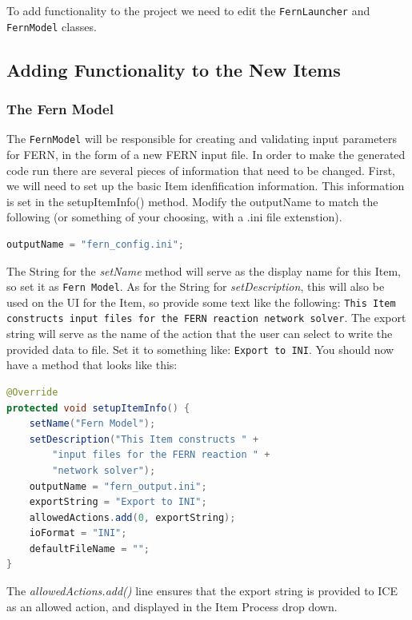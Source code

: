 To add functionality to the project we need to edit
the \texttt{FernLauncher} and \texttt{FernModel} classes.

\subsection{Adding Functionality to the New Items}

\subsubsection{The Fern Model}

The \texttt{FernModel} will be responsible for creating and
validating input parameters for FERN, in the form of a new FERN input file.  In
order to make the generated code run there are several pieces of information that need to be changed.  First, we
will need to set up the basic Item idenfification information. This information
is set in the setupItemInfo() method. Modify the outputName to match the
following (or something of your choosing, with a .ini file extenstion).

\begin{lstlisting}[language=Java]
outputName = "fern_config.ini";
\end{lstlisting}

The String for the \emph{setName} method will serve as the display name
for this Item, so set it as \texttt{Fern Model}.
As for the String for \emph{setDescription}, this will also be used on the UI
for the Item, so provide some text like the following: \texttt{This Item constructs input files
for the FERN reaction network solver}. The export string will serve as the name
of the action that the user can select to write the provided data to file. Set
it to something like: \texttt{Export to INI}. You should now have a method that
looks like this:

\begin{lstlisting}[language=Java]
@Override
protected void setupItemInfo() {
	setName("Fern Model");
	setDescription("This Item constructs " +
	    "input files for the FERN reaction " +
	    "network solver"); 
	outputName = "fern_output.ini";   
	exportString = "Export to INI";
	allowedActions.add(0, exportString);
	ioFormat = "INI";
	defaultFileName = "";
}
\end{lstlisting}

The \emph{allowedActions.add()} line ensures that the export string is provided
to ICE as an allowed action, and displayed in the Item Process drop down.

